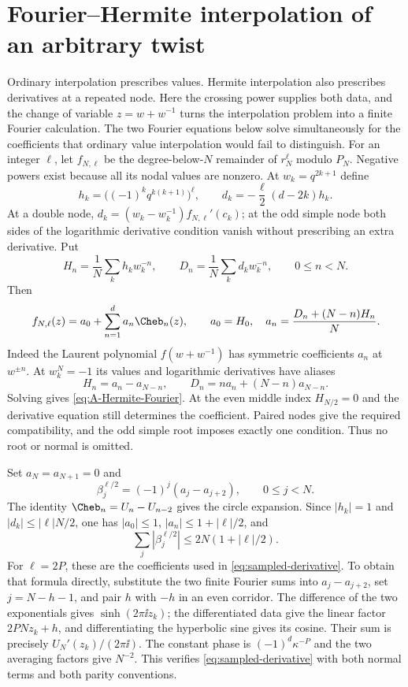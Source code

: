 \section{Fourier--Hermite interpolation of an arbitrary twist}\label{app:fourier}

Ordinary interpolation prescribes values. Hermite interpolation also prescribes derivatives at a repeated node. Here the crossing power supplies both data, and the change of variable $z=w+w^{-1}$ turns the interpolation problem into a finite Fourier calculation. The two Fourier equations below solve simultaneously for the coefficients that ordinary value interpolation would fail to distinguish.
For an integer $\ell$, let $f_{N,\ell}$ be the degree-below-$N$ remainder of $r_N^\ell$ modulo $P_N$. Negative powers exist because all its nodal values are nonzero. At $w_k=q^{2k+1}$ define
\[
 h_k=\bigl((-1)^kq^{k(k+1)}\bigr)^\ell,
 \qquad d_k=-\frac\ell2(d-2k)h_k.
\]
At a double node, $d_k=(w_k-w_k^{-1})f_{N,\ell}'(c_k)$; at the odd simple node both sides of the logarithmic derivative condition vanish without prescribing an extra derivative. Put
\[
 H_n=\frac1N\sum_kh_kw_k^{-n},\qquad
 D_n=\frac1N\sum_kd_kw_k^{-n},\qquad0\le n<N.
\]
Then
\begin{equation}\label{eq:A-Hermite-Fourier}
 f_{N,\ell}(z)=a_0+\sum_{n=1}^{d}a_n\Cheb_n(z),\qquad
 a_0=H_0,\quad a_n=\frac{D_n+(N-n)H_n}{N}.
\end{equation}
Indeed the Laurent polynomial $f(w+w^{-1})$ has symmetric coefficients $a_n$ at $w^{\pm n}$. At $w_k^N=-1$ its values and logarithmic derivatives have aliases
\[
 H_n=a_n-a_{N-n},\qquad
 D_n=na_n+(N-n)a_{N-n}.
\]
Solving gives \eqref{eq:A-Hermite-Fourier}. At the even middle index $H_{N/2}=0$ and the derivative equation still determines the coefficient. Paired nodes give the required compatibility, and the odd simple root imposes exactly one condition. Thus no root or normal is omitted.

Set $a_N=a_{N+1}=0$ and
\[
 \beta_j^{\ell/2}=(-1)^j(a_j-a_{j+2}),\qquad0\le j<N.
\]
The identity $\Cheb_n=U_n-U_{n-2}$ gives the circle expansion. Since $|h_k|=1$ and $|d_k|\le|\ell|N/2$, one has $|a_0|\le1$, $|a_n|\le1+|\ell|/2$, and
\[
 \sum_j|\beta_j^{\ell/2}|\le2N(1+|\ell|/2).
\]
For $\ell=2P$, these are the coefficients used in \eqref{eq:sampled-derivative}. To obtain that formula directly, substitute the two finite Fourier sums into $a_j-a_{j+2}$, set $j=N-h-1$, and pair $h$ with $-h$ in an even corridor. The difference of the two exponentials gives $\sinh(2\pi\ii z_k)$; the differentiated data give the linear factor $2PNz_k+h$, and differentiating the hyperbolic sine gives its cosine. Their sum is precisely $U_N'(z_k)/(2\pi\ii)$. The constant phase is $(-1)^d\kappa^{-P}$ and the two averaging factors give $N^{-2}$. This verifies \eqref{eq:sampled-derivative} with both normal terms and both parity conventions.
